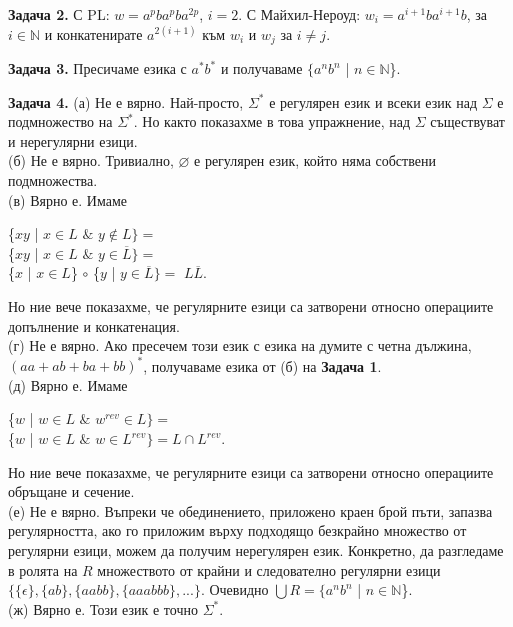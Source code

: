 \documentclass{article}
\begin{document}
    \textbf{Задача 2.} С PL: $w = a^pba^pba^{2p}$, $i = 2$. С Майхил-Нероуд: $w_i = a^{i+1}ba^{i+1}b$,
    за $i \in \mathbb{N}$ и конкатенирате $a^{2(i+1)}$ към $w_i$ и $w_j$ за $i \neq j$.

    \vspace{15pt}

    \textbf{Задача 3.} Пресичаме езика с $a^*b^*$ и получаваме $\{a^nb^n$ | $n \in \mathbb{N}$\}.

    \vspace{15pt}

    \textbf{Задача 4.} (а) Не е вярно. Най-просто, $\Sigma^*$ е регулярен език и всеки
    език над $\Sigma$ е подмножество на $\Sigma^*$. Но както показахме в това упражнение,
    над $\Sigma$ съществуват и нерегулярни езици. \\
    (б) Не е вярно. Тривиално, $\varnothing$ е регулярен език, който няма собствени
    подмножества. \\
    (в) Вярно е. Имаме \\
    \begin{center}
        \{$xy$ | $x \in L$ $\&$ $y \notin L\} =$ \\
        \{$xy$ | $x \in L$ $\&$ $y \in \overline{L}\} =$ \\
        \{$x$ | $x \in L$\} $\circ$ \{$y$ | $y \in \overline{L}\} =$ 
        $L\overline{L}$. 
    \end{center}
    Но ние вече показахме, че регулярните езици са затворени относно операциите
    допълнение и конкатенация. \\
    (г) Не е вярно. Ако пресечем този език с езика на думите с четна дължина, $(aa + ab + ba + bb)^*$,
    получаваме езика от (б) на \textbf{Задача 1}. \\
    (д) Вярно е. Имаме \\
    \begin{center}
        \{$w$ | $w \in L$ $\&$ $w^{rev} \in L\} =$ \\
        \{$w$ | $w \in L$ $\&$ $w \in L^{rev}\} = L \cap L^{rev}$.
    \end{center}
    Но ние вече показахме, че регулярните езици са затворени относно операциите
    обръщане и сечение. \\
    (е) Не е вярно. Въпреки че обединението, приложено краен брой пъти, запазва
    регулярността, ако го приложим върху подходящо безкрайно множество от регулярни
    езици, можем да получим нерегулярен език. Конкретно, да разгледаме в ролята на $R$
    множеството от крайни и следователно регулярни езици $\{\{\epsilon\},\{ab\},\{aabb\},\{aaabbb\},...\}$.
    Очевидно $\bigcup R = \{a^nb^n$ | $n \in \mathbb{N}$\}. \\
    (ж) Вярно е. Този език е точно $\Sigma^*$.
\end{document}
